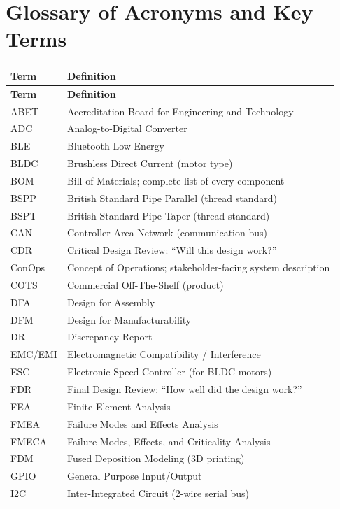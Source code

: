 \documentclass[11pt,letterpaper,twoside,openany]{book}
\begin{document}
\chapter*{Glossary of Acronyms and Key Terms}

\begin{longtable}{l p{10cm}}
\toprule
\textbf{Term} & \textbf{Definition} \\
\midrule
\endfirsthead
\toprule
\textbf{Term} & \textbf{Definition} \\
\midrule
\endhead
ABET\index{ABET outcomes} & Accreditation Board for Engineering and Technology \\
ADC & Analog-to-Digital Converter \\
BLE & Bluetooth Low Energy \\
BLDC & Brushless Direct Current (motor type) \\
BOM & Bill of Materials; complete list of every component \\
BSPP & British Standard Pipe Parallel (thread standard) \\
BSPT & British Standard Pipe Taper (thread standard) \\
CAN & Controller Area Network (communication bus) \\
CDR & Critical Design Review: ``Will this design work?'' \\
ConOps & Concept of Operations; stakeholder-facing system description \\
COTS & Commercial Off-The-Shelf (product) \\
DFA & Design for Assembly \\
DFM & Design for Manufacturability\index{Design for Manufacturability (DFM)} \\
DR & Discrepancy Report \\
EMC/EMI & Electromagnetic Compatibility / Interference \\
ESC & Electronic Speed Controller (for BLDC motors) \\
FDR & Final Design Review: ``How well did the design work?'' \\
FEA & Finite Element Analysis \\
FMEA & Failure Modes and Effects Analysis \\
FMECA & Failure Modes, Effects, and Criticality Analysis \\
FDM & Fused Deposition Modeling (3D printing) \\
GPIO & General Purpose Input/Output \\
I2C & Inter-Integrated Circuit (2-wire serial bus) \\

\end{longtable}
\end{document}
